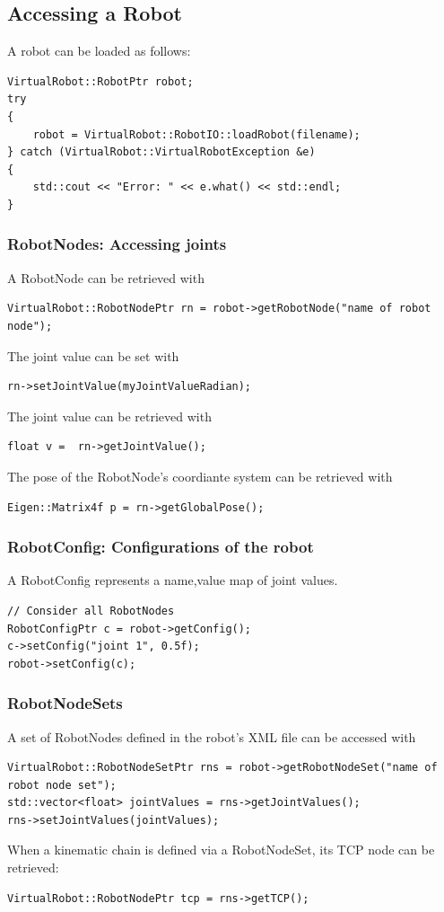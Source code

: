 \documentclass{book}
\begin{document}
\subsection{Accessing a Robot}
A robot can be loaded as follows:
\begin{lstlisting}
VirtualRobot::RobotPtr robot;
try
{
    robot = VirtualRobot::RobotIO::loadRobot(filename);
} catch (VirtualRobot::VirtualRobotException &e)
{
    std::cout << "Error: " << e.what() << std::endl;
}
\end{lstlisting}
\subsubsection{RobotNodes: Accessing joints}
A RobotNode can be retrieved with
\begin{lstlisting}
VirtualRobot::RobotNodePtr rn = robot->getRobotNode("name of robot node");
\end{lstlisting}
The joint value can be set with 
\begin{lstlisting}
rn->setJointValue(myJointValueRadian);
\end{lstlisting}
The joint value can be retrieved with
\begin{lstlisting}
float v =  rn->getJointValue();
\end{lstlisting}
The pose of the RobotNode's coordiante system can be retrieved with
\begin{lstlisting}
Eigen::Matrix4f p = rn->getGlobalPose();
\end{lstlisting}
\subsubsection{RobotConfig: Configurations of the robot}
A RobotConfig represents a name,value map of joint values.
\begin{lstlisting}
// Consider all RobotNodes
RobotConfigPtr c = robot->getConfig();
c->setConfig("joint 1", 0.5f);
robot->setConfig(c);
\end{lstlisting}
\subsubsection{RobotNodeSets}
A set of RobotNodes defined in the robot's XML file can be accessed with
\begin{lstlisting}
VirtualRobot::RobotNodeSetPtr rns = robot->getRobotNodeSet("name of robot node set");
std::vector<float> jointValues = rns->getJointValues();
rns->setJointValues(jointValues);
\end{lstlisting}
When a kinematic chain is defined via a RobotNodeSet, its TCP node can be retrieved: 
\begin{lstlisting}
VirtualRobot::RobotNodePtr tcp = rns->getTCP();
\end{lstlisting}
\end{document}
